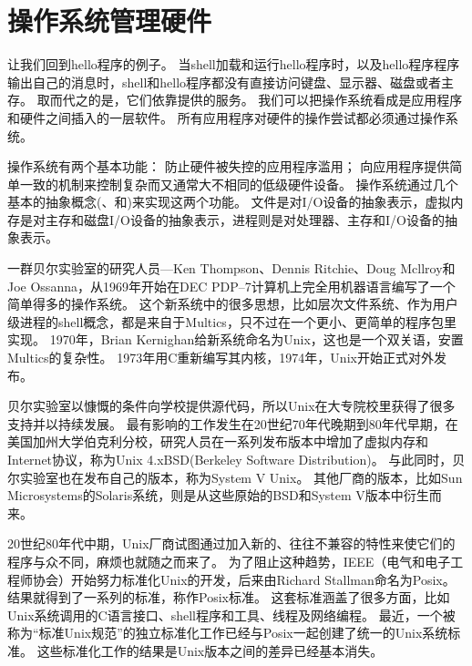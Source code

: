 \section{操作系统管理硬件}
{
    让我们回到hello程序的例子。
    当shell加载和运行hello程序时，以及hello程序程序输出自己的消息时，shell和hello程序都没有直接访问键盘、显示器、磁盘或者主存。
    取而代之的是，它们依靠提供的服务。
    我们可以把操作系统看成是应用程序和硬件之间插入的一层软件。
    所有应用程序对硬件的操作尝试都必须通过操作系统。

    操作系统有两个基本功能：
    防止硬件被失控的应用程序滥用；
    向应用程序提供简单一致的机制来控制复杂而又通常大不相同的低级硬件设备。
    操作系统通过几个基本的抽象概念(、和)来实现这两个功能。
    文件是对I/O设备的抽象表示，虚拟内存是对主存和磁盘I/O设备的抽象表示，进程则是对处理器、主存和I/O设备的抽象表示。

    \begin{sidenote}
        一群贝尔实验室的研究人员---Ken Thompson、Dennis Ritchie、Doug Mcllroy和Joe Ossanna，从1969年开始在DEC PDP--7计算机上完全用机器语言编写了一个简单得多的操作系统。
        这个新系统中的很多思想，比如层次文件系统、作为用户级进程的shell概念，都是来自于Multics，只不过在一个更小、更简单的程序包里实现。
        1970年，Brian Kernighan给新系统命名为Unix，这也是一个双关语，安置Multics的复杂性。
        1973年用C重新编写其内核，1974年，Unix开始正式对外发布。

        贝尔实验室以慷慨的条件向学校提供源代码，所以Unix在大专院校里获得了很多支持并以持续发展。
        最有影响的工作发生在20世纪70年代晚期到80年代早期，在美国加州大学伯克利分校，研究人员在一系列发布版本中增加了虚拟内存和Internet协议，称为Unix 4.xBSD(Berkeley Software Distribution)。
        与此同时，贝尔实验室也在发布自己的版本，称为System V Unix。
        其他厂商的版本，比如Sun Microsystems的Solaris系统，则是从这些原始的BSD和System V版本中衍生而来。

        20世纪80年代中期，Unix厂商试图通过加入新的、往往不兼容的特性来使它们的程序与众不同，麻烦也就随之而来了。
        为了阻止这种趋势，IEEE（电气和电子工程师协会）开始努力标准化Unix的开发，后来由Richard Stallman命名为Posix。
        结果就得到了一系列的标准，称作Posix标准。
        这套标准涵盖了很多方面，比如Unix系统调用的C语言接口、shell程序和工具、线程及网络编程。
        最近，一个被称为``标准Unix规范''的独立标准化工作已经与Posix一起创建了统一的Unix系统标准。
        这些标准化工作的结果是Unix版本之间的差异已经基本消失。
    \end{sidenote}

}
